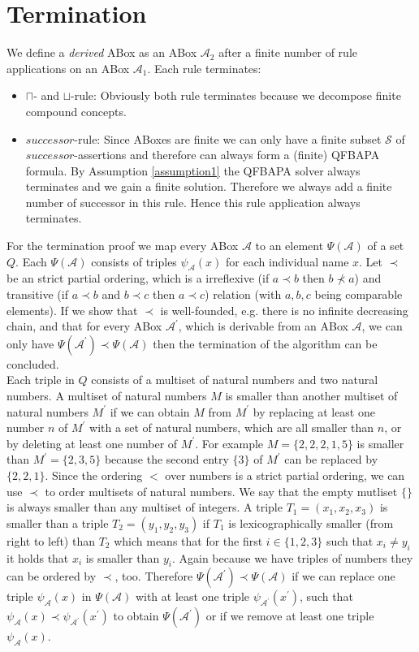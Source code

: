 \documentclass{book}
\theoremstyle{break}
\theoremstyle{definition}
\begin{document}
\section{Termination}
We define a \textit{derived} ABox as an ABox $\mathcal{A}_2$ after a finite number of rule applications on an ABox $\mathcal{A}_1$. Each rule terminates:
\begin{itemize}
\item $\sqcap$- and $\sqcup$-rule: Obviously both rule terminates because we decompose finite compound concepts.
\item $successor$-rule: Since ABoxes are finite we can only have a finite subset $\mathcal{S}$ of $successor$-assertions and therefore can always form a (finite) QFBAPA formula. By Assumption \ref{assumption1}  the QFBAPA solver always terminates and we gain a finite solution. Therefore we always add a finite number of successor in this rule. Hence this rule application always terminates.
\end{itemize}
For the termination proof we map every ABox $\mathcal{A}$ to an element $\Psi(\mathcal{A})$ of a set $Q$. Each $\Psi(\mathcal{A})$ consists of triples $\psi_\mathcal{A}(x)$ for each individual name $x$. Let $\prec$ be an strict partial ordering, which is a irreflexive (if $a\prec b$ then $b\not\prec a$) and transitive (if $a\prec b$ and $b\prec c$ then $a\prec c$) relation (with $a,b,c$ being comparable elements). If we show that $\prec$ is well-founded, e.g. there is no infinite decreasing chain, and that for every ABox $\mathcal{A}^\prime$, which is derivable from an ABox $\mathcal{A}$, we can only have $\Psi(\mathcal{A}^\prime)\prec\Psi(\mathcal{A})$ then the termination of the algorithm can be concluded.\\
Each triple in $Q$ consists of a multiset of natural numbers and two natural numbers. A multiset of natural numbers $M$ is smaller than another multiset of natural numbers $M^\prime$ if we can obtain $M$ from $M^\prime$ by replacing at least one number $n$ of $M^\prime$ with a set of natural numbers, which are all smaller than $n$, or by deleting at least one number of $M^\prime$. For example $M=\{2,2,2,1,5\}$ is smaller than $M^\prime=\{2,3,5\}$ because the second entry $\{3\}$ of $M^\prime$ can be replaced by $\{2,2,1\}$. Since the ordering $<$ over numbers is a strict partial ordering, we can use $\prec$ to order multisets of natural numbers. We say that the empty mutliset $\{\}$ is always smaller than any multiset of integers. A triple $T_1=(x_1,x_2, x_3)$ is smaller than a triple $T_2=(y_1,y_2,y_3)$ if $T_1$ is lexicographically smaller (from right to left) than $T_2$ which means that for the first $i\in\{1,2,3\}$ such that $x_i\neq y_i$ it holds that $x_i$ is smaller than $y_i$. Again because we have triples of numbers they can be ordered by $\prec$, too. Therefore $\Psi(\mathcal{A}^\prime)\prec\Psi(\mathcal{A})$ if we can replace one triple $\psi_\mathcal{A}(x)$ in $\Psi(\mathcal{A})$ with at least one triple $\psi_{\mathcal{A}^\prime}(x^\prime)$, such that $\psi_\mathcal{A}(x)\prec\psi_{\mathcal{A}^\prime}(x^\prime)$ to obtain $\Psi(\mathcal{A}^\prime)$ or if we remove at least one triple $\psi_\mathcal{A}(x)$.\\
\end{document}
